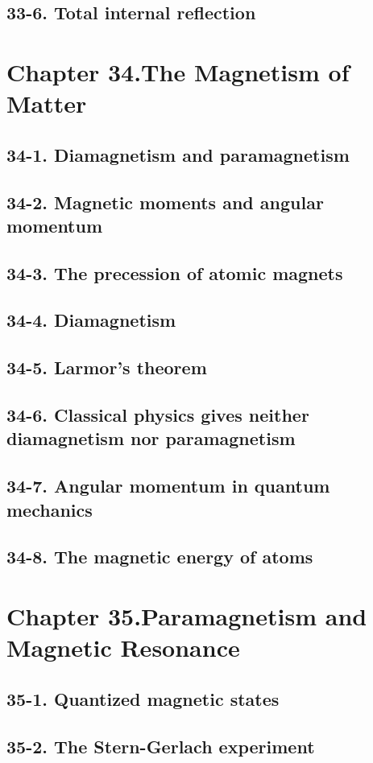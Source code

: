 \documentclass{article}
\begin{document}
\subsection{33-6. Total internal reflection}
\section{Chapter 34.The Magnetism of Matter}
\subsection{34-1. Diamagnetism and paramagnetism}
\subsection{34-2. Magnetic moments and angular momentum}
\subsection{34-3. The precession of atomic magnets}
\subsection{34-4. Diamagnetism}
\subsection{34-5. Larmor’s theorem}
\subsection{34-6. Classical physics gives neither diamagnetism nor paramagnetism}
\subsection{34-7. Angular momentum in quantum mechanics}
\subsection{34-8. The magnetic energy of atoms}
\section{Chapter 35.Paramagnetism and Magnetic Resonance}
\subsection{35-1. Quantized magnetic states}
\subsection{35-2. The Stern-Gerlach experiment}
\end{document}

